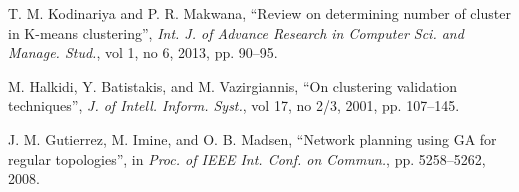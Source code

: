 \documentclass[conference]{IEEEtran}
\begin{document}
\begin{thebibliography}{1}
T. M. Kodinariya and P. R. Makwana, ``Review on determining number of cluster in K-means clustering'', \textit{Int. J. of Advance Research in
Computer Sci. and Manage. Stud.}, vol 1, no 6, 2013, pp. 90--95.

M. Halkidi, Y. Batistakis, and M. Vazirgiannis, ``On clustering validation techniques'', \textit{J. of Intell. Inform. Syst.}, vol 17, no 2/3, 2001, pp. 107--145.

J. M. Gutierrez, M. Imine, and O. B. Madsen, ``Network planning using GA for regular topologies'', in \textit{Proc. of IEEE Int. Conf. on Commun.},  pp. 5258--5262, 2008.


\end{thebibliography}




\end{document}
